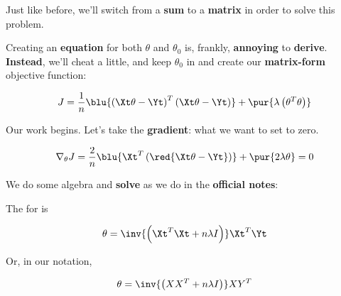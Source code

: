         Just like before, we'll switch from a \textbf{sum} to a \textbf{matrix} in order to solve this problem.
        
        Creating an \textbf{equation} for both $\theta$ and $\theta_0$ is, frankly, \textbf{annoying} to \textbf{derive}. \textbf{Instead}, we'll cheat a little, and keep $\theta_0$ in and create our \textbf{matrix-form} objective function:
        
        \begin{equation}
            J = \frac{1}{n}
                \blu{
                    \left( \Xt \theta  - \Yt  \right)^T
                    \left( \Xt \theta  - \Yt  \right) 
                }
                + 
                \pur{\lambda 
                    \left( \theta^T \theta    \right)
                }
        \end{equation}
        
        Our work begins. Let's take the \textbf{gradient}: what we want to set to zero.
        
        \begin{equation}
            \nabla_\theta J = 
                \frac{2}{n} 
                \blu{
                    \Xt^T
                    \left( \red{ \Xt \theta  - \Yt } \right) 
                }
                +
                \pur{ 2 \lambda \theta}
            =0
        \end{equation}
        
        We do some algebra and \textbf{solve} as we do in the \textbf{official notes}:\\
        
        \begin{kequation}
            The  for  is 
            
            \begin{equation*}
                \theta = 
                \inv{ 
                    \left(  \Xt^T\Xt + n \lambda I \right)  
                }
                \Xt^T  \Yt
            \end{equation*}
            
            Or, in our  notation,
            
            \begin{equation*}
                \theta = 
                \inv{ 
                    \left(  XX^T + n \lambda I \right)  
                }
                XY^T
            \end{equation*}
            
        \end{kequation}
        
